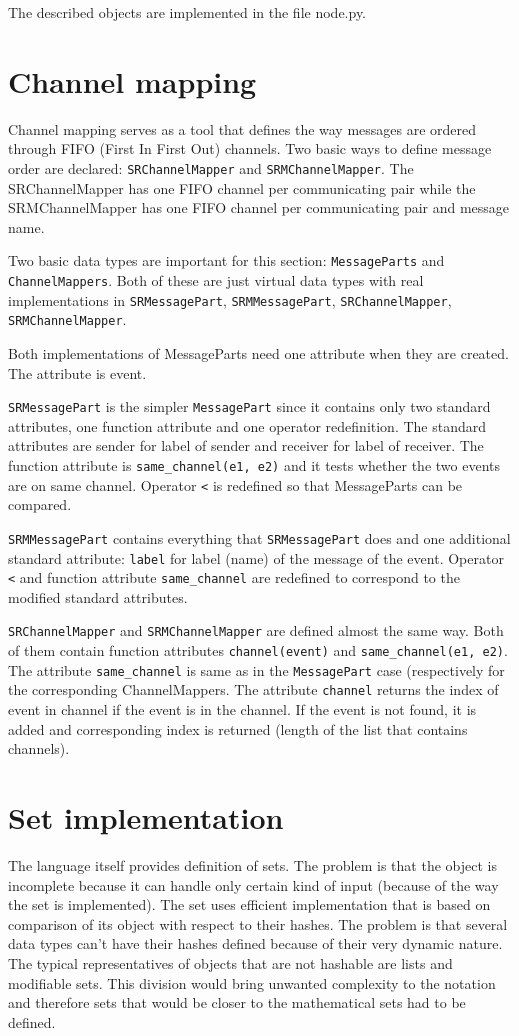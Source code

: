 \documentclass[11pt,oneside]{fithesis2}
\newcommand{\T}[1]{\texttt{#1}}
\begin{document}
The described objects are implemented in the file node.py.


\section{Channel mapping}
Channel mapping serves as a tool that defines the way messages are ordered through FIFO (First In First Out) channels. Two basic ways to define message order are declared: \T{SRChannelMapper} and \T{SRMChannelMapper}. The SRChannelMapper has one FIFO channel per communicating pair while the SRMChannelMapper has one FIFO channel per communicating pair and message name.

Two basic data types are important for this section: \T{MessageParts} and \T{ChannelMappers}. Both of these are just virtual data types with real implementations in \T{SRMessagePart}, \T{SRMMessagePart}, \T{SRChannelMapper}, \T{SRMChannelMapper}.

Both implementations of MessageParts need one attribute when they are created. The attribute is event.

\T{SRMessagePart} is the simpler \T{MessagePart} since it contains only two standard attributes, one function attribute and one operator redefinition. The standard attributes are sender for label of sender and receiver for label of receiver. The function attribute is \T{same\_channel(e1, e2)} and it tests whether the two events are on same channel. Operator \T{<} is redefined so that MessageParts can be compared.

\T{SRMMessagePart} contains everything that \T{SRMessagePart} does and one additional standard attribute: \T{label} for label (name) of the message of the event. Operator \T{<} and function attribute \T{same\_channel} are redefined to correspond to the modified standard attributes.

\T{SRChannelMapper} and \T{SRMChannelMapper} are defined almost the same way. Both of them contain function attributes \T{channel(event)} and \T{same\_channel(e1, e2)}. The attribute \T{same\_channel} is same as in the \T{MessagePart} case (respectively for the corresponding ChannelMappers. The attribute \T{channel} returns the index of event in channel if the event is in the channel. If the event is not found, it is added and corresponding index is returned (length of the list that contains channels).


\section{Set implementation}
The language itself provides definition of sets. The problem is that the object is incomplete because it can handle only certain kind of input (because of the way the set is implemented). The set uses efficient implementation that is based on comparison of its object with respect to their hashes. The problem is that several data types can't have their hashes defined because of their very dynamic nature. The typical representatives of objects that are not hashable are lists and modifiable sets. This division would bring unwanted complexity to the notation and therefore sets that would be closer to the mathematical sets had to be defined.
\end{document}
